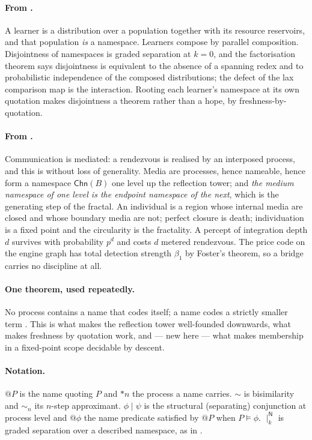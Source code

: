 \documentclass[11pt]{article}
\makeatletter
\theoremstyle{plain}
\theoremstyle{definition}
\theoremstyle{remark}
\newcommand{\Nsp}{\mathsf{N}}
\newcommand{\Chn}{\mathsf{Chn}}
\newcommand{\sep}[2]{\mathbin{\mid_{#2}^{#1}}}
\newcommand{\quo}[1]{@#1}
\newcommand{\drop}[1]{*#1}
\newcommand{\bt}{\beta_1}
\newcommand{\bisim}{\sim}
\newcommand{\bisimn}[1]{\sim_{#1}}
\makeatother
\begin{document}
\paragraph{From \cite{compose}.}
A learner is a distribution over a population together with its resource
reservoirs, and that population \emph{is} a namespace. Learners compose by
parallel composition. Disjointness of namespaces is graded separation at
$k=0$, and the factorisation theorem says disjointness is equivalent to
the absence of a spanning redex and to probabilistic independence of the
composed distributions; the defect of the lax comparison map is the
interaction. Rooting each learner's namespace at its own quotation makes
disjointness a theorem rather than a hope, by freshness-by-quotation.

\paragraph{From \cite{engine}.}
Communication is mediated: a rendezvous is realised by an interposed
process, and this is without loss of generality. Media are processes,
hence nameable, hence form a namespace $\Chn(B)$ one level up the
reflection tower; and \emph{the medium namespace of one level is the
endpoint namespace of the next}, which is the generating step of the
fractal. An individual is a region whose internal media are closed and
whose boundary media are not; perfect closure is death; individuation is a
fixed point and the circularity is the fractality. A percept of
integration depth $d$ survives with probability $p^d$ and costs $d$
metered rendezvous. The price code on the engine graph has total detection
strength $\bt$ by Foster's theorem, so a bridge carries no discipline at
all.

\paragraph{One theorem, used repeatedly.}
No process contains a name that codes itself; a name codes a strictly
smaller term \cite{RHO}. This is what makes the reflection tower
well-founded downwards, what makes freshness by quotation work, and ---
new here --- what makes membership in a fixed-point scope decidable by
descent.

\paragraph{Notation.}
$\quo{P}$ is the name quoting $P$ and $\drop{n}$ the process a name
carries. $\bisim$ is bisimilarity and $\bisimn{n}$ its $n$-step
approximant. $\phi \mid \psi$ is the structural (separating) conjunction
at process level and $\quo{\phi}$ the name predicate satisfied by
$\quo{P}$ when $P \models \phi$. $\sep{\Nsp}{k}$ is graded separation over
a described namespace, as in \cite[\S3]{game}.
\end{document}
